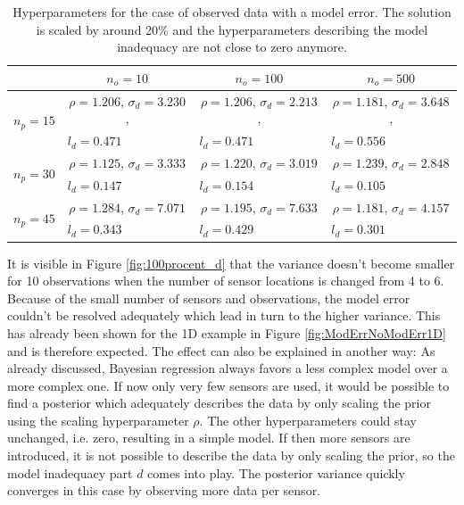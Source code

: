\documentclass[%
  a4paper,oneside,%
  11pt,%
  smallchapters,
  style=printdev,
  extramargin,
  green,%
  rgb, <cmyk>
  ]{tubsbook}
\begin{document}
\begin{table}[!ht]
\centering
\caption{Hyperparameters for the case of observed data with a model error. The solution is scaled by around 20\% and the hyperparameters describing the model inadequacy are not close to zero anymore.}
\label{tab:100procWithError}
\begin{tabular}{@{}lccc@{}}
\toprule
                            & $n_o = 10$                      & $n_o = 100$                     & $n_o = 500$                     \\ \midrule
\multirow{2}{*}{$n_p = 15$} & $\rho=1.206$, $\sigma_d=3.230$, & $\rho=1.206$, $\sigma_d=2.213$, & $\rho=1.181$, $\sigma_d=3.648$, \\
                            & \multicolumn{1}{l}{$l_d=0.471$} & \multicolumn{1}{l}{$l_d=0.471$} & \multicolumn{1}{l}{$l_d=0.556$} \\
\multirow{2}{*}{$n_p = 30$} & $\rho=1.125$, $\sigma_d=3.333$  & $\rho=1.220$, $\sigma_d=3.019$  & $\rho=1.239$, $\sigma_d=2.848$  \\
                            & \multicolumn{1}{l}{$l_d=0.147$} & \multicolumn{1}{l}{$l_d=0.154$} & \multicolumn{1}{l}{$l_d=0.105$} \\
\multirow{2}{*}{$n_p = 45$} & $\rho=1.284$, $\sigma_d=7.071$  & $\rho=1.195$, $\sigma_d=7.633$  & $\rho=1.181$, $\sigma_d=4.157$  \\
                            & \multicolumn{1}{l}{$l_d=0.343$} & \multicolumn{1}{l}{$l_d=0.429$} & \multicolumn{1}{l}{$l_d=0.301$} \\ \bottomrule
\end{tabular}
\end{table}
%
It is visible in Figure \ref{fig:100procent_d} that the variance doesn't become smaller for 10 observations when the number of sensor locations is changed from 4 to 6. Because of the small number of sensors and observations, the model error couldn't be resolved adequately which lead in turn to the higher variance. This has already been shown for the 1D example in Figure \ref{fig:ModErrNoModErr1D} and is therefore expected. The effect can also be explained in another way: As already discussed, Bayesian regression always favors a less complex model over a more complex one. If now only very few sensors are used, it would be possible to find a posterior which adequately describes the data by only scaling the prior using the scaling hyperparameter $\rho$. The other hyperparameters could stay unchanged, i.e. zero, resulting in a simple model. If then more sensors are introduced, it is not possible to describe the data by only scaling the prior, so the model inadequacy part $d$ comes into play. The posterior variance quickly converges in this case by observing more data per sensor.
\end{document}
